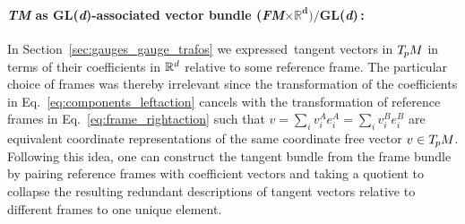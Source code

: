 \paragraph{\textit{TM} as GL(\textit{d})-associated vector bundle (\textit{FM}$\boldsymbol{\times \mathds{R}^d)/}$GL(\textit{d})\,:}
In Section~\ref{sec:gauges_gauge_trafos} we expressed~tangent vectors in $T_{\mkern-1.5mu p}\mkern-.5muM$ in terms of their coefficients in $\mathbb{R}^d$ relative to some reference frame.
The particular choice of frames was thereby irrelevant since the transformation of the coefficients in Eq.~\eqref{eq:components_leftaction} cancels with the transformation of reference frames in Eq.~\eqref{eq:frame_rightaction} such that $v = \sum_i v^A_i e^A_{i} = \sum_i v^B_i e^B_{i}$ are equivalent coordinate representations of the same coordinate free vector $v\in T_{\mkern-1.5mu p}\mkern-.5muM$.
Following this idea, one can construct the tangent bundle from the frame bundle by pairing reference frames with coefficient vectors and taking a quotient to collapse the resulting redundant descriptions of tangent vectors relative to different frames to one unique element.


